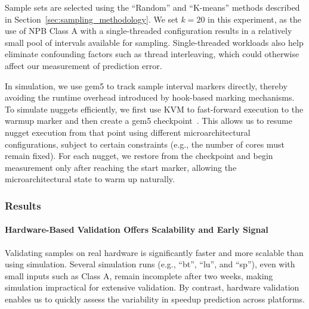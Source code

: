 Sample sets are selected using the ``Random'' and ``K-means'' methods described in Section~\ref{sec:sampling_methodology}.
We set $k = 20$ in this experiment, as the use of NPB Class A with a single-threaded configuration results in a relatively small pool of intervals available for sampling.
Single-threaded workloads also help eliminate confounding factors such as thread interleaving, which could otherwise affect our measurement of prediction error.


In simulation, we use gem5 to track sample interval markers directly, thereby avoiding the runtime overhead introduced by hook-based marking mechanisms.
To simulate nuggets efficiently, we first use KVM to fast-forward execution to the warmup marker and then create a gem5 checkpoint~\cite{gem5-checkpoints}.
This allows us to resume nugget execution from that point using different microarchitectural configurations, subject to certain constraints (e.g., the number of cores must remain fixed).
For each nugget, we restore from the checkpoint and begin measurement only after reaching the start marker, allowing the microarchitectural state to warm up naturally.

\subsubsection{Results}\label{sec:case_study_simulation_results}

\paragraph*{Hardware-Based Validation Offers Scalability and Early Signal}

Validating samples on real hardware is significantly faster and more scalable than using simulation.
Several simulation runs (e.g., ``bt'', ``lu'', and ``sp''), even with small inputs such as Class A, remain incomplete after two weeks, making simulation impractical for extensive validation.
By contrast, hardware validation enables us to quickly assess the variability in speedup prediction across platforms.

